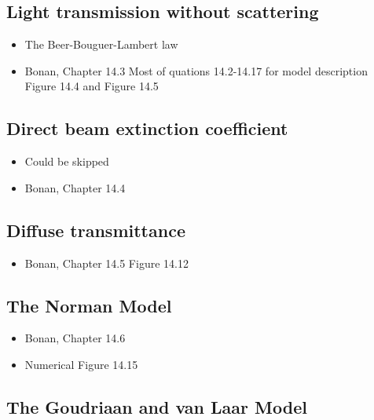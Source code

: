 \documentclass[oneside]{book}
\providecommand{\tightlist}{%
  \setlength{\itemsep}{0pt}\setlength{\parskip}{0pt}}
\begin{document}
\subsection{Light transmission without
scattering}\label{light-transmission-without-scattering}

\begin{itemize}
\tightlist
\item
  The Beer-Bouguer-Lambert law
\item
  Bonan, Chapter 14.3 Most of quations 14.2-14.17 for model description
  Figure 14.4 and Figure 14.5
\end{itemize}

\subsection{Direct beam extinction
coefficient}\label{direct-beam-extinction-coefficient}

\begin{itemize}
\tightlist
\item
  Could be skipped
\item
  Bonan, Chapter 14.4
\end{itemize}

\subsection{Diffuse transmittance}\label{diffuse-transmittance}

\begin{itemize}
\tightlist
\item
  Bonan, Chapter 14.5 Figure 14.12
\end{itemize}

\subsection{The Norman Model}\label{the-norman-model}

\begin{itemize}
\tightlist
\item
  Bonan, Chapter 14.6
\item
  Numerical Figure 14.15
\end{itemize}

\subsection{The Goudriaan and van Laar
Model}\label{the-goudriaan-and-van-laar-model}
\end{document}

